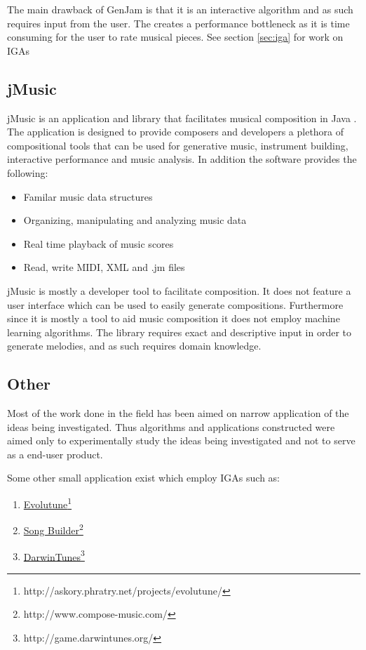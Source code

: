 The main drawback of GenJam is that it is an interactive algorithm and as such requires input from the user. The creates a performance bottleneck as it is time consuming for the user to rate musical pieces.
See section \ref{sec:iga} for work on \acsp{IGA}

\subsection{jMusic}
jMusic is an application and library that facilitates musical composition in Java \cite{Sorensen}. The application is designed to provide composers and developers a plethora of compositional tools that can be used for generative music, instrument building, interactive performance and music analysis. In addition the software provides the following:
\begin{itemize}
\item Familar music data structures
\item Organizing, manipulating and analyzing music data
\item Real time playback of music scores
\item Read, write \ac{MIDI}, \ac{XML} and .jm files
\end{itemize}

jMusic is mostly a developer tool to facilitate composition. It does not feature a user interface which can be used to easily generate compositions. Furthermore since it is mostly a tool to aid music composition it does not employ machine learning algorithms. The library requires exact and descriptive input in order to generate melodies, and as such requires domain knowledge.

\subsection{Other}
Most of the work done in the field has been aimed on narrow application of the ideas being investigated. Thus algorithms and applications constructed were aimed only to experimentally study the ideas being investigated and not to serve as a end-user product. 

Some other small application exist which employ \acp{IGA} such as:
\begin{enumerate}
\item \href{http://askory.phratry.net/projects/evolutune/}{Evolutune}\footnote{http://askory.phratry.net/projects/evolutune/}
\item \href{http://www.compose-music.com/}{Song Builder}\footnote{http://www.compose-music.com/}
\item \href{http://game.darwintunes.org/}{DarwinTunes}\footnote{http://game.darwintunes.org/}
\end{enumerate}

